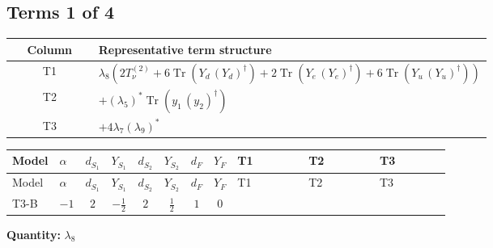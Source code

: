 \documentclass[8pt]{article}
\begin{document}
\begin{landscape}
\subsection*{Terms 1 of 4}
\begin{center}
\begin{tabular}{@{}c >{\raggedright\arraybackslash}p{0.82\linewidth}@{}}
\toprule
Column & Representative term structure \\
\midrule
T1 & \(\displaystyle {\lambda_{8}} (2 T_{\nu}^{(2)}+6 \operatorname{Tr}\!\left({Y_d}\,\left({Y_d}\right)^{\dagger}\right)+2 \operatorname{Tr}\!\left({Y_e}\,\left({Y_e}\right)^{\dagger}\right)+6 \operatorname{Tr}\!\left({Y_u}\,\left({Y_u}\right)^{\dagger}\right))\) \\
\midrule
T2 & \(\displaystyle +\left({\lambda_5}\right)^{*} \operatorname{Tr}\!\left({y_1}\,\left({y_2}\right)^{\dagger}\right)\) \\
\midrule
T3 & \(\displaystyle +4 {\lambda_{7}} \left({\lambda_{9}}\right)^{*}\) \\
\midrule
\bottomrule
\end{tabular}
\end{center}
\smallskip
\tiny
\begin{longtable}{@{}llcccccc >{\raggedright\arraybackslash}p{0.21\linewidth} >{\raggedright\arraybackslash}p{0.21\linewidth} >{\raggedright\arraybackslash}p{0.21\linewidth}@{}}
\toprule
Model & $\alpha$ & $d_{S_1}$ & $Y_{S_1}$ & $d_{S_2}$ & $Y_{S_2}$ & $d_F$ & $Y_F$ & T1 & T2 & T3 \\
\midrule
\endfirsthead
\toprule
Model & $\alpha$ & $d_{S_1}$ & $Y_{S_1}$ & $d_{S_2}$ & $Y_{S_2}$ & $d_F$ & $Y_F$ & T1 & T2 & T3 \\
\midrule
\endhead
T3-B & $-1$ & $2$ & $-\frac{1}{2}$ & $2$ & $\frac{1}{2}$ & $1$ & $0$ & \scriptsize\adjustbox{max width=\linewidth}{$\begin{gathered} {\lambda_{8}} (2 T_{\nu}^{(2)}+6 \operatorname{Tr}\!\left({Y_d}\,\left({Y_d}\right)^{\dagger}\right)+2 \operatorname{Tr}\!\left({Y_e}\,\left({Y_e}\right)^{\dagger}\right)+6 \operatorname{Tr}\!\left({Y_u}\,\left({Y_u}\right)^{\dagger}\right))\end{gathered}$} & \scriptsize\adjustbox{max width=\linewidth}{$\begin{gathered} +\left({\lambda_5}\right)^{*} \operatorname{Tr}\!\left({y_1}\,\left({y_2}\right)^{\dagger}\right)\end{gathered}$} & \scriptsize\adjustbox{max width=\linewidth}{$\begin{gathered} +4 {\lambda_{7}} \left({\lambda_{9}}\right)^{*}\end{gathered}$} \\
\midrule
\bottomrule
\end{longtable}
\clearpage
\noindent\textbf{Quantity: }$\lambda_{8}$\par\smallskip

\end{landscape}
\end{document}

